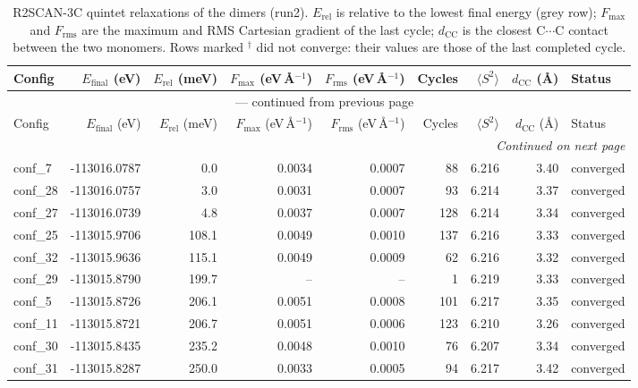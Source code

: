 
\begin{longtable}{@{}lrrrrrrrl@{}}
\caption{R2SCAN-3C quintet relaxations of the dimers (run2). $E_{\mathrm{rel}}$ is relative to the
         lowest final energy (grey row); $F_{\mathrm{max}}$ and $F_{\mathrm{rms}}$ are the maximum and RMS
         Cartesian gradient of the last cycle; $d_{\mathrm{CC}}$ is the closest C$\cdots$C contact between the
         two monomers. Rows marked $^{\dagger}$ did not converge: their values are those of the last
         completed cycle.}\label{tab:run2_relaxation}\\
\toprule
Config & $E_{\mathrm{final}}$ (eV) & $E_{\mathrm{rel}}$ (meV) & $F_{\mathrm{max}}$ (eV\,\AA$^{-1}$) &
$F_{\mathrm{rms}}$ (eV\,\AA$^{-1}$) & Cycles & $\langle S^2\rangle$ & $d_{\mathrm{CC}}$ (\AA) & Status\\
\midrule
\endfirsthead
\multicolumn{9}{c}{{\tablename}~\thetable{} --- continued from previous page}\\
\toprule
Config & $E_{\mathrm{final}}$ (eV) & $E_{\mathrm{rel}}$ (meV) & $F_{\mathrm{max}}$ (eV\,\AA$^{-1}$) &
$F_{\mathrm{rms}}$ (eV\,\AA$^{-1}$) & Cycles & $\langle S^2\rangle$ & $d_{\mathrm{CC}}$ (\AA) & Status\\
\midrule
\endhead
\midrule
\multicolumn{9}{r}{\emph{Continued on next page}}\\
\endfoot
\bottomrule
\endlastfoot
\rowcolor{gray!20} conf\_7 & -113016.0787 & 0.0 & 0.0034 & 0.0007 & 88 & 6.216 & 3.40 & converged \\
conf\_28 & -113016.0757 & 3.0 & 0.0031 & 0.0007 & 93 & 6.214 & 3.37 & converged \\
conf\_27 & -113016.0739 & 4.8 & 0.0037 & 0.0007 & 128 & 6.214 & 3.34 & converged \\
conf\_25 & -113015.9706 & 108.1 & 0.0049 & 0.0010 & 137 & 6.216 & 3.33 & converged \\
conf\_32 & -113015.9636 & 115.1 & 0.0049 & 0.0009 & 62 & 6.216 & 3.32 & converged \\
conf\_29 & -113015.8790 & 199.7 & -- & -- & 1 & 6.219 & 3.33 & converged \\
conf\_5 & -113015.8726 & 206.1 & 0.0051 & 0.0008 & 101 & 6.217 & 3.35 & converged \\
conf\_11 & -113015.8721 & 206.7 & 0.0051 & 0.0006 & 123 & 6.210 & 3.26 & converged \\
conf\_30 & -113015.8435 & 235.2 & 0.0048 & 0.0010 & 76 & 6.207 & 3.34 & converged \\
conf\_31 & -113015.8287 & 250.0 & 0.0033 & 0.0005 & 94 & 6.217 & 3.42 & converged \\

\end{longtable}
